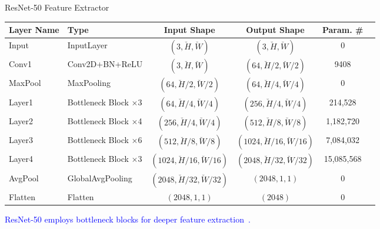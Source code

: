 \documentclass[aspectratio=169]{beamer}
\let\oldcite\cite %
\renewcommand{\cite}[1]{{\tiny\oldcite{#1}}}
\begin{document}
\begin{frame}{ResNet-50 Feature Extractor}
\begin{table}
\begin{tabularx}{\linewidth}{p{1.5cm}lcccc}
\toprule
\textbf{Layer Name} & \textbf{Type} & \textbf{Input Shape} & \textbf{Output Shape} & \textbf{Param. \#} \\
\midrule
Input & InputLayer & $(3, \breve{H}, \breve{W})$ & $(3, \breve{H}, \breve{W})$ & 0 \\
Conv1 & Conv2D+BN+ReLU & $(3, \breve{H}, \breve{W})$ & $(64, \breve{H}/2, \breve{W}/2)$ & 9408 \\
MaxPool & MaxPooling & $(64, \breve{H}/2, \breve{W}/2)$ & $(64, \breve{H}/4, \breve{W}/4)$ & 0 \\
Layer1 & Bottleneck Block $\times$3 & $(64, \breve{H}/4, \breve{W}/4)$ & $(256, \breve{H}/4, \breve{W}/4)$ & 214,528 \\
Layer2 & Bottleneck Block $\times$4 & $(256, \breve{H}/4, \breve{W}/4)$ & $(512, \breve{H}/8, \breve{W}/8)$ & 1,182,720 \\
Layer3 & Bottleneck Block $\times$6 & $(512, \breve{H}/8, \breve{W}/8)$ & $(1024, \breve{H}/16, \breve{W}/16)$ & 7,084,032 \\
Layer4 & Bottleneck Block $\times$3 & $(1024, \breve{H}/16, \breve{W}/16)$ & $(2048, \breve{H}/32, \breve{W}/32)$ & 15,085,568 \\
AvgPool & GlobalAvgPooling & $(2048, \breve{H}/32, \breve{W}/32)$ & $(2048, 1, 1)$ & 0 \\
Flatten & Flatten & $(2048,1,1)$ & $(2048)$ & 0 \\
\bottomrule
\end{tabularx}
\end{table}
\begin{center}
    \textcolor{blue}{ResNet-50 employs bottleneck blocks for deeper feature extraction~\cite{mascarenhas2021comparison}.}
\end{center}
\end{frame}
\end{document}
